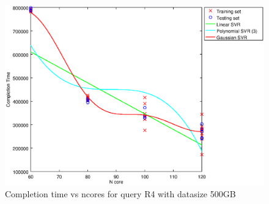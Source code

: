 
\begin {figure}[hbtp]
\centering
\includegraphics[width=\textwidth]{output/R4_500_ONLY_1_LINEAR_NCORE/plot_R4_500_bestmodels.eps}
\caption{Completion time vs ncores for query R4 with datasize 500GB}
\label{fig:only_1_linear_R4_500}
\end {figure}
